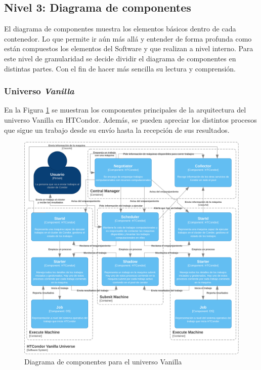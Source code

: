 \subsection{Nivel 3: Diagrama de componentes}
\noindent
El diagrama de componentes muestra los elementos básicos dentro de cada contenedor. Lo que permite ir aún más allá y entender de forma profunda como están compuestos los elementos del Software y que realizan a nivel interno. Para este nivel de granularidad se decide dividir el diagrama de componentes en distintas partes. Con el fin de hacer más sencilla su lectura y comprensión.

\subsubsection{Universo \textit{Vanilla}}
\noindent
En la Figura \ref{fig:C4Nivel3Vanilla} se muestran los componentes principales de la arquitectura del universo Vanilla en HTCondor. Además, se pueden apreciar los distintos procesos que sigue un trabajo desde su envío hasta la recepción de sus resultados.

\begin{figure}[H]
	\centering
	\includegraphics[scale=0.09]{tablas-images/C4/Diagramas HTCondor-Nivel 3 - Vanilla.drawio.png}
	\caption{Diagrama de componentes para el universo Vanilla}
    \label{fig:C4Nivel3Vanilla}
\end{figure}

